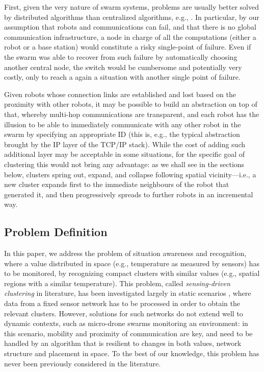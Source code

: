 {First, given the very nature of swarm systems, problems are usually better solved by distributed algorithms than centralized algorithms, e.g., \cite{hoshino:2013,DBLP:journals/asc/CruzNM17}. In particular, by our assumption that robots and communications can fail, and that there is no global communication infrastructure, a node in charge of all the computations (either a robot or a base station) would constitute a risky single-point of failure. Even if the swarm was able to recover from such failure by automatically choosing another central node, the switch would be cumbersome and potentially very costly, only to reach a again a situation with another single point of failure.

Given robots whose connection links are established and lost based on the proximity with other robots, it may be possible to build an abstraction on top of that, whereby multi-hop communications are transparent, and each robot has the illusion to be able to immediately communicate with any other robot in the swarm by specifying an appropriate ID (this is, e.g., the typical abstraction brought by the IP layer of the TCP/IP stack). While the cost of adding such additional layer may be acceptable in some situations, for the specific goal of clustering this would not bring any advantage: as we shall see in the sections below, clusters spring out, expand, and collapse following spatial vicinity---i.e., a new cluster expands first to the immediate neighbours of the robot that generated it, and then progressively spreads to further robots in an incremental way.
}

\subsection{Problem Definition}\label{ssec:problem-def}

In this paper, we address the problem of situation awareness and recognition, where a value distributed in space (e.g., temperature as measured by sensors) has to be monitored,
 by recognizing compact clusters with similar values (e.g., spatial regions with a similar temperature).
 This problem, called \emph{sensing-driven clustering} in literature, has been investigated largely in static scenarios \cite{DBLP:journals/jaihc/KucukBSK20,DBLP:journals/ijcomsys/PhamLPC10,DBLP:conf/ccnc/LinM07},
 where data from a fixed sensor network has to be processed in order to obtain the relevant clusters.
 However, solutions for such networks do not extend well to dynamic contexts, such as micro-drone swarms monitoring an environment:
 in this scenario, mobility and proximity of communication are key,
 and need to be handled by an algorithm that is resilient to changes in both values, network structure and placement in space.
 To the best of our knowledge, this problem has never been previously considered in the literature.

